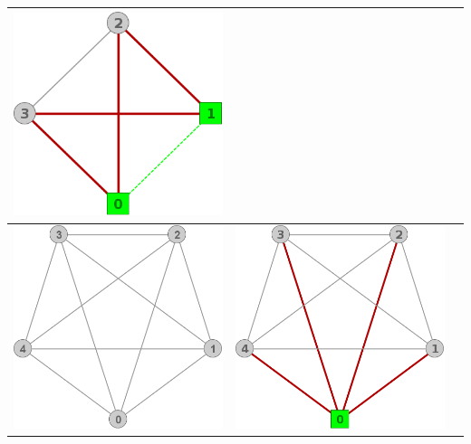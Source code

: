 \begin{center}
\begin{tabular}{ |c||c||c| }
			\includegraphics[scale = 0.3]{img/ej3/constructiva_golosa/K4_st2.png} \\
			\hline
			\includegraphics[scale = 0.3]{img/ej3/constructiva_golosa/K5_st0.png} &
			\includegraphics[scale = 0.3]{img/ej3/constructiva_golosa/K5_st1.png} &

\end{tabular}
\end{center}
